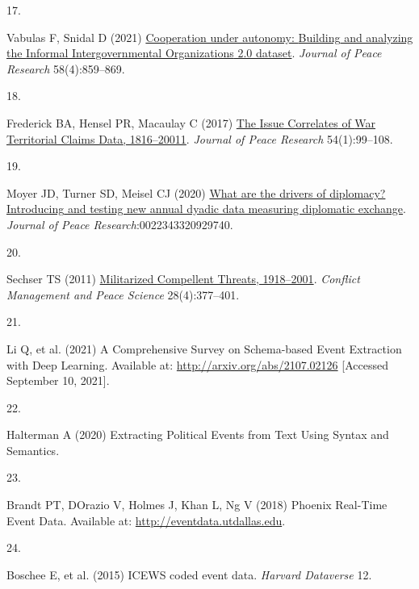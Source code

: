 \documentclass{article}
\newlength{\cslhangindent}
\newlength{\csllabelwidth}
\newlength{\cslentryspacingunit} %
\newenvironment{CSLReferences}[2] %
 {%
  \setlength{\parindent}{0pt}
  \ifodd #1
  \let\oldpar\par
  \def\par{\hangindent=\cslhangindent\oldpar}
  \fi
  \setlength{\parskip}{#2\cslentryspacingunit}
 }%
 {}
\newcommand{\CSLLeftMargin}[1]{\parbox[t]{\csllabelwidth}{#1}}
\newcommand{\CSLRightInline}[1]{\parbox[t]{\linewidth - \csllabelwidth}{#1}\break}
\begin{document}
\begin{CSLReferences}{0}{0}
\leavevmode{}%
\CSLLeftMargin{17. }
\CSLRightInline{Vabulas F, Snidal D (2021)
\href{https://doi.org/10.1177/0022343320943920}{Cooperation under
autonomy: {Building} and analyzing the {Informal Intergovernmental
Organizations} 2.0 dataset}. \emph{Journal of Peace Research}
58(4):859--869.}

\leavevmode{}%
\CSLLeftMargin{18. }
\CSLRightInline{Frederick BA, Hensel PR, Macaulay C (2017)
\href{https://doi.org/10.1177/0022343316676311}{The {Issue Correlates}
of {War Territorial Claims Data}, 1816--20011}. \emph{Journal of Peace
Research} 54(1):99--108.}

\leavevmode{}%
\CSLLeftMargin{19. }
\CSLRightInline{Moyer JD, Turner SD, Meisel CJ (2020)
\href{https://doi.org/10.1177/0022343320929740}{What are the drivers of
diplomacy? {Introducing} and testing new annual dyadic data measuring
diplomatic exchange}. \emph{Journal of Peace
Research}:0022343320929740.}

\leavevmode{}%
\CSLLeftMargin{20. }
\CSLRightInline{Sechser TS (2011)
\href{https://doi.org/10.1177/0738894211413066}{Militarized {Compellent
Threats}, 1918--2001}. \emph{Conflict Management and Peace Science}
28(4):377--401.}

\leavevmode{}%
\CSLLeftMargin{21. }
\CSLRightInline{Li Q, et al. (2021) A {Comprehensive Survey} on
{Schema-based Event Extraction} with {Deep Learning}. Available at:
\url{http://arxiv.org/abs/2107.02126} {[}Accessed September 10,
2021{]}.}

\leavevmode{}%
\CSLLeftMargin{22. }
\CSLRightInline{Halterman A (2020) Extracting {Political Events} from
{Text Using Syntax} and {Semantics}.}

\leavevmode{}%
\CSLLeftMargin{23. }
\CSLRightInline{Brandt PT, DOrazio V, Holmes J, Khan L, Ng V (2018)
Phoenix {Real-Time Event Data}. Available at:
\url{http://eventdata.utdallas.edu}.}

\leavevmode{}%
\CSLLeftMargin{24. }
\CSLRightInline{Boschee E, et al. (2015) {ICEWS} coded event data.
\emph{Harvard Dataverse} 12.}


\end{CSLReferences}
\end{document}

